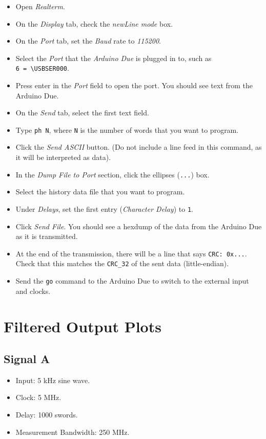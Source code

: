 \documentclass[11pt]{article}
\providecommand{\tightlist}{%
      \setlength{\itemsep}{0pt}\setlength{\parskip}{0pt}}
\begin{document}
    \begin{itemize}
\tightlist
\item
  Open \emph{Realterm}.
\item
  On the \emph{Display} tab, check the \emph{newLine mode} box.
\item
  On the \emph{Port} tab, set the \emph{Baud} rate to \emph{115200}.
\item
  Select the \emph{Port} that the \emph{Arduino Due} is plugged in to,
  such as \texttt{6\ =\ \textbackslash{}USBSER000}.
\item
  Press enter in the \emph{Port} field to open the port. You should see
  text from the Arduino Due.
\item
  On the \emph{Send} tab, select the first text field.
\item
  Type \texttt{ph\ N}, where \texttt{N} is the number of words that you
  want to program.
\item
  Click the \emph{Send ASCII} button. (Do not include a line feed in
  this command, as it will be interpreted as data).
\item
  In the \emph{Dump File to Port} section, click the ellipses
  (\texttt{...}) box.
\item
  Select the history data file that you want to program.
\item
  Under \emph{Delays}, set the first entry (\emph{Character Delay}) to
  \texttt{1}.
\item
  Click \emph{Send File}. You should see a hexdump of the data from the
  Arduino Due as it is transmitted.
\item
  At the end of the transmission, there will be a line that says
  \texttt{CRC:\ 0x...}. Check that this matches the \texttt{CRC\_32} of
  the sent data (little-endian).
\item
  Send the \texttt{go} command to the Arduino Due to switch to the
  external input and clocks.
\end{itemize}

    \section{Filtered Output Plots}\label{filtered-output-plots}

    \subsection{Signal A}\label{signal-a}

    \begin{itemize}
\tightlist
\item
  Input: 5 kHz sine wave.
\item
  Clock: 5 MHz.
\item
  Delay: 1000 swords.
\item
  Measurement Bandwidth: 250 MHz.
\end{itemize}
\end{document}
